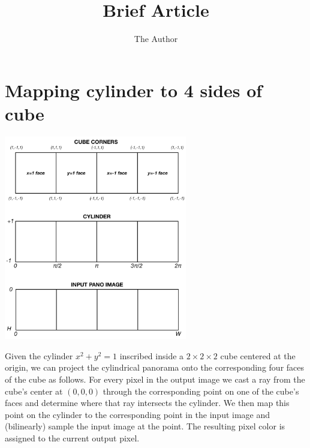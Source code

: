 \documentclass[11pt, oneside]{article}   	%
\title{Brief Article}
\author{The Author}
\begin{document}

\section{Mapping cylinder to 4 sides of cube}   

\begin{center}
\includegraphics[width=0.6\textwidth]{cube_cylinder} 
\end{center}      
   
Given the cylinder $x^2 + y^2 = 1$ inscribed inside a $2 \times 2 \times 2$ cube
centered at the origin, we can project the cylindrical panorama onto the corresponding
four faces of the cube as follows.
For every pixel in the output image we cast a ray from the cube's center at $(0,0,0)$
through the corresponding point on one of the cube's faces and determine where that
ray intersects the cylinder. We then map this point on the cylinder to the corresponding
point in the input image and (bilinearly) sample the input image at the point. 
The resulting pixel color is assigned to the current output pixel.
\end{document}
